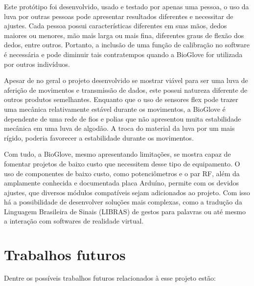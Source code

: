 \documentclass[
	12pt,				%
	openright,			%
	oneside,			%
	a4paper,			%
	english,			%
	brazil				%
	]{abntex2}
\begin{document}
		Este protótipo foi desenvolvido, usado e testado por apenas uma pessoa, o uso da luva por outras pessoas pode apresentar resultados diferentes e necessitar de ajustes. Cada pessoa possui características diferentes em suas mãos, dedos maiores ou menores, mão mais larga ou mais fina, diferentes graus de flexão dos dedos, entre outros. Portanto, a inclusão de uma função de calibração no software é necessária e pode diminuir tais contratempos quando a BioGlove for utilizada por outros indivíduos.

		Apesar de no geral o projeto desenvolvido se mostrar viável para ser uma luva de aferição de movimentos e transmissão de dados, este possui natureza diferente de outros produtos semelhantes. Enquanto que o uso de sensores flex pode trazer uma mecânica relativamente estável durante os movimentos, a BioGlove é dependente de uma rede de fios e polias que não apresentou muita estabilidade mecânica em uma luva de algodão. A troca do material da luva por um  mais rígido, poderia favorecer a estabilidade durante os movimentos.

		Com tudo, a BioGlove, mesmo apresentando limitações, se mostra capaz de fomentar projetos de baixo custo que necessitem desse tipo de equipamento. O uso de componentes de baixo custo, como potenciômetros e o par RF, além da amplamente conhecida e documentada placa Arduíno, permite com os devidos ajustes, que diversos módulos compatíveis sejam adicionados ao projeto. Com isso há a possibilidade de desenvolver soluções mais complexas, como a tradução da Linguagem Brasileira de Sinais (LIBRAS) de gestos para palavras ou até mesmo a interação com softwares de realidade virtual.

			\section{Trabalhos futuros}		

		Dentre os possíveis trabalhos futuros relacionados à esse projeto estão:
\end{document}
